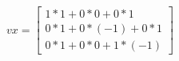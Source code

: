 \documentclass[preview]{standalone}
\begin{document}
\begin{align*}
vx=\begin{bmatrix}
                        1*1+0*0+0*1\\
                        0*1+0*( -1) +0*1\\
                        0*1+0*0+1*( -1)
                        \end{bmatrix}\\
\end{align*}
\end{document}
